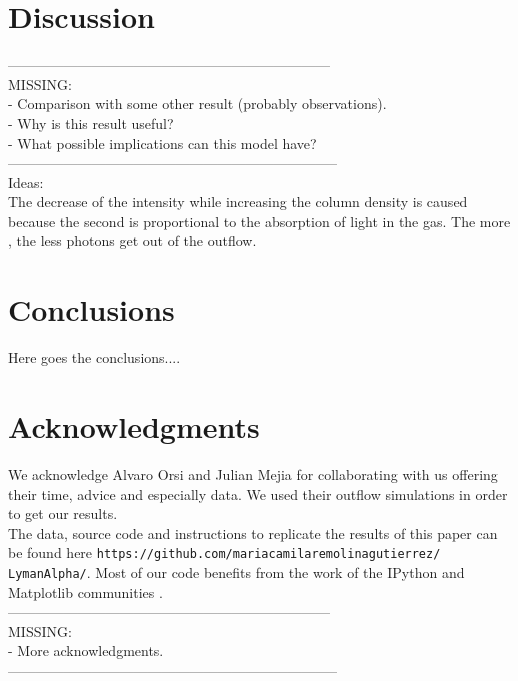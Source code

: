 \documentclass{latex/emulateapj}
\begin{document}
\section{Discussion}
\label{sec:discussion}

---------------------------------------------------------------------\\
MISSING: \\
- Comparison with some other result (probably observations).\\
- Why is this result useful? \\
- What possible implications can this model have?\\
-----------------------------------------------------------------------\\

Ideas: \\

The decrease of the intensity while increasing the column density is caused because the second is proportional to the absorption of light in the gas. The more \lognh, the less photons get out of the outflow.

\section{Conclusions}
\label{sec:conclusions}
Here goes the conclusions....

\section*{Acknowledgments}

We acknowledge Alvaro Orsi and Julian Mejia for collaborating with us offering their time, advice and especially data. We used their outflow simulations in order to get our results.\\

The data, source code and instructions to replicate the results of this paper can be found here {\texttt{https://github.com/mariacamilaremolinagutierrez/ LymanAlpha/}}.
Most of our code benefits from the work of the IPython and Matplotlib communities \citep{IPython,matplotlib}.\\

---------------------------------------------------------------------\\
MISSING: \\
- More acknowledgments.\\
-----------------------------------------------------------------------\\
\end{document}

